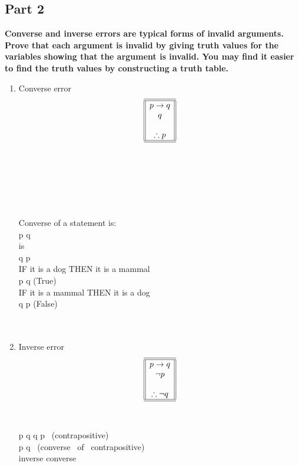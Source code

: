 \begin{enumerate}
\subsection*{Part 2}
{\bf Converse and inverse errors are typical forms of invalid arguments. Prove that each argument is invalid by giving truth values for the variables showing that the argument is invalid. You may find it easier to find the truth values by constructing a truth table.}\\
 \begin{enumerate}[label=(\alph*)]
\item Converse error
\[
\begin{array}{||c||}
\hline \hline
p \to q\\
q\\
\\
\therefore p\\
\hline \hline
\end{array}
\]\\\\
\\
\\
\\
\\
Converse of a statement is: \\
p \to q \\
is \\
q \to p \\

IF it is a dog THEN it is a mammal \\
p \to q (True) \\

IF it is a mammal THEN it is a dog \\
q \to p (False) \\
 \\\\

\item Inverse error
\[
\begin{array}{||c||}
\hline \hline
p \to q\\
\neg p\\
\\
\therefore \neg q\\
\hline \hline
\end{array}
\]\\\\
p \to q \equiv \neg q \to \neg p \ (contrapositive) \\
\neg p \to \neg q \ (converse \ of \ contrapositive) \\
inverse \equiv converse \\


\end{enumerate}
\end{enumerate}
